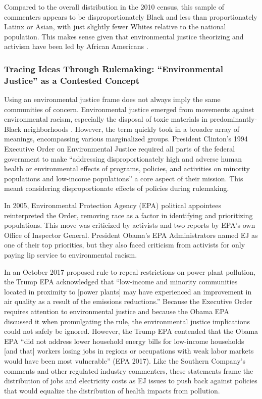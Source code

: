 \documentclass[
      12pt,
        ]{article}
\begin{document}
Compared to the overall distribution in the 2010 census, this sample of commenters
appears to be disproportionately Black and less than proportionately
Latinx or Asian, with just slightly fewer Whites relative to the
national population. This makes sense given that environmental justice
theorizing and activism have been led by African Americans
\citep{Bullard1993}.

\hypertarget{tracing-ideas-through-rulemaking-environmental-justice-as-a-contested-concept}{%
\subsubsection{Tracing Ideas Through Rulemaking: ``Environmental Justice'' as a Contested Concept}\label{tracing-ideas-through-rulemaking-environmental-justice-as-a-contested-concept}}

Using an environmental justice frame does not always imply the same
communities of concern. Environmental justice emerged from movements
against environmental racism, especially the disposal of toxic
materials in predominantly-Black neighborhoods \citep{Bullard1993}. However, the term
quickly took in a broader array of meanings, encompassing various marginalized groups. President Clinton's 1994 Executive Order on
Environmental Justice required all parts of the federal government
to make ``addressing disproportionately high and adverse human health or
environmental effects of programs, policies, and activities on minority
populations and low-income populations'' a core aspect of their mission.
This meant considering disproportionate effects of policies during rulemaking.

In 2005, Environmental Protection Agency (EPA) political appointees reinterpreted the Order, removing race as a factor in identifying and prioritizing populations. This move was criticized by activists and two reports by EPA's own Office of Inspector General. President Obama's EPA Administrators named EJ as one of their top priorities, but they also faced criticism from activists for only paying lip service to environmental racism.

In an October 2017 proposed rule to repeal
restrictions on power plant pollution, the Trump EPA acknowledged that
``low-income and minority communities located in proximity to {[}power
plants{]} may have experienced an improvement in air quality as a result
of the emissions reductions.'' Because the Executive Order requires
attention to environmental justice and because the Obama EPA discussed
it when promulgating the rule, the environmental justice implications could not safely
be ignored. However, the Trump EPA contended that the Obama EPA ``did not
address lower household energy bills for low-income households {[}and
that{]} workers losing jobs in regions or occupations with weak labor
markets would have been most vulnerable'' (EPA 2017). Like the Southern Company's comments and other regulated industry commenters, these statements frame the distribution of jobs and electricity costs as EJ issues to push back against policies that would equalize the distribution of health impacts from pollution.
\end{document}

